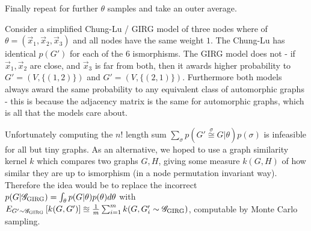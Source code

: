 Finally repeat for further $\theta$ samples and take an outer average.


Consider a simplified Chung-Lu / GIRG model of three nodes where of $\theta = (\vec{x}_1, \vec{x}_2, \vec{x}_3)$ and all nodes have the same weight $1$.
The Chung-Lu has identical $p(G')$ for each of the 6 ismorphisms.
The GIRG  model does not - if $\vec{x}_1, \vec{x}_2$ are close, and $\vec{x}_3$ is far from both, then it awards higher probability to $G' = (V, \{(1,2)\})$ and $G' = (V, \{(2, 1)\})$.
Furthermore both models always award the same probability to any equivalent class of automorphic graphs - this is because the adjacency matrix is the same for automorphic graphs, which is all that the models care about.

Unfortunately computing the $n!$ length sum $\sum_{\sigma} p(G' \stackrel{\sigma}{\cong} G | \theta) p(\sigma)$ is infeasible for all but tiny graphs. As an alternative, we hoped to use a graph similarity kernel $k$ which compares two graphs $G, H$, giving some measure $k(G, H)$ of how similar they are up to ismorphism (in a node permutation invariant way).
Therefore the idea would be to replace the incorrect $p(G | \mathscr{G}_{\mathrm{GIRG}}) = \int_\theta p(G | \theta) p(\theta) d\theta$ with 
$E_{G' \sim \mathscr{G}_{\mathrm{GIRG}}} \left [ k(G, G') \right ]\approxeq \frac{1}{m} \sum_{i=1}^m k(G, G'_i \sim \mathscr{G}_{\mathrm{GIRG}})$, computable by Monte Carlo sampling.






  
